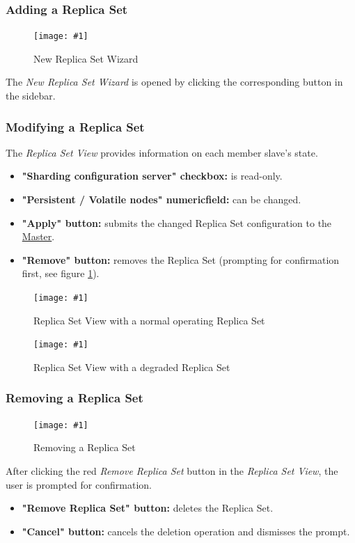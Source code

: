 \documentclass[a4paper, 11pt]{article}
\newcommand{\mamidscreenshot}[1]{\texttt{[image: \#1]}}
\newcommand{\uiel}[3]{\item \textbf{"#1" #2:} #3}
\begin{document}
\subsubsection{Adding a Replica Set}\label{subsec:ui:new_replica_set}
\begin{figure}[H]
	\centering
	\mamidscreenshot{screenshots/new_replica_set}
	\caption{New Replica Set Wizard}
\end{figure}
The \textit{New Replica Set Wizard} is opened by clicking the corresponding button in the sidebar.
\pagebreak %
\subsubsection{Modifying a Replica Set}\label{subsec:ui:modify_replica_set}
The \textit{Replica Set View} provides information on each member slave's state.
\begin{itemize}
	\uiel{Sharding configuration server}{checkbox}{is read-only.}
	\uiel{Persistent / Volatile nodes}{numericfield}{can be changed.}
	\uiel{Apply}{button}{submits the changed Replica Set configuration to the \hyperref[SM:Master]{Master}.}
	\uiel{Remove}{button}{removes the Replica Set (prompting for confirmation first, see figure \ref{fig:replica_set_remove}).}
\end{itemize}
\begin{figure}[H]
	\centering
	\mamidscreenshot{screenshots/replica_set_overview_active.png}
	\caption{Replica Set View with a normal operating Replica Set}
\end{figure}
\begin{figure}[H]
	\centering
	\mamidscreenshot{screenshots/replica_set_overview_degraded}
	\caption{Replica Set View with a degraded Replica Set}
\end{figure}
\subsubsection{Removing a Replica Set}\label{subsec:ui:remove_replica_set}
\begin{figure}[H]
	\centering
	\mamidscreenshot{screenshots/replica_set_remove}
	\caption{Removing a Replica Set}
	\label{fig:replica_set_remove}
\end{figure}
After clicking the red \textit{Remove Replica Set} button in the \textit{Replica Set View}, the user is prompted for confirmation.
\begin{itemize}
	\uiel{Remove Replica Set}{button} deletes the Replica Set.
	\uiel{Cancel}{button} cancels the deletion operation and dismisses the prompt.
\end{itemize}
\end{document}
